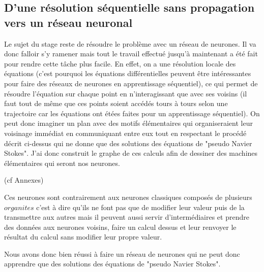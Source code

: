 \documentclass[10pt]{article}
\begin{document}
\subsection{D'une résolution séquentielle sans propagation vers un réseau neuronal}
Le sujet du stage reste de résoudre le problème avec un réseau de neurones. Il va donc falloir s'y ramener mais tout le travail effectué jusqu'à maintenant a été fait pour rendre cette tâche plus facile. En effet, on a une résolution locale des équations (c'est pourquoi les équations différentielles peuvent être intéressantes pour faire des réseaux de neurones en apprentissage séquentiel), ce qui permet de résoudre l'équation sur chaque point en n'interagissant que avec ses voisins (il faut tout de même que ces points soient accédés tours à tours selon une trajectoire car les équations ont étées faites pour un apprentissage séquentiel). On peut donc imaginer un plan avec des motifs élémentaires qui organiseraient leur voisinage immédiat en communiquant entre eux tout en respectant le procédé décrit ci-dessus qui ne donne que des solutions des équations de "pseudo Navier Stokes". J'ai donc construit le graphe de ces calculs afin de dessiner des machines élémentaires qui seront nos neurones.

(cf Annexes)

Ces neurones sont contrairement aux neurones classiques composés de plusieurs $\textit{organites}$ c'est à dire qu'ils ne font pas que de modifier leur valeur puis de la transmettre aux autres mais il peuvent aussi servir d'intermédiaires et prendre des données aux neurones voisins, faire un calcul dessus et leur renvoyer le résultat du calcul sans modifier leur propre valeur.

Nous avons donc bien réussi à faire un réseau de neurones qui ne peut donc apprendre que des solutions des équations de "pseudo Navier Stokes".
\end{document}
